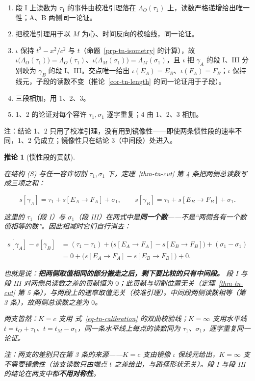 \documentclass[
  chinese,
  a4paper,
  UTF8,
  12pt,
  oneside,
  openany]{ctexbook}
\providecommand{\tightlist}{%
  \setlength{\itemsep}{0pt}\setlength{\parskip}{0pt}}
\theoremstyle{plain}
\theoremstyle{plain}
\theoremstyle{plain}
\theoremstyle{definition}
\theoremstyle{plain}
\newtheorem{corollary}{推论}[chapter]
\theoremstyle{plain}
\theoremstyle{remark}
\begin{document}
\begin{enumerate}
\def\labelenumi{\arabic{enumi}.}
\tightlist
\item
  段 I 上读数为 \(\tau_1\) 的事件由校准引理落在 \(\Lambda_O(\tau_1)\)
  上，读数严格递增给出唯一性；A、B 两侧同一论证。
\item
  把校准引理用于以 \(M\) 为心、时间反向的校验线，同一论证。
\item
  \(\iota\) 保持 \(t^{2}-x^{2}/c^{2}\) 与
  \(t\)（命题~\ref{prp-tn-isometry} 的计算），故
  \(\iota\bigl(\Lambda_O(\tau_1)\bigr)=\Lambda_O(\tau_1)\)、\(\iota\bigl(\Lambda_M(\sigma_1)\bigr)=\Lambda_M(\sigma_1)\)，且
  \(\iota\) 把 \(\gamma_A\) 的段 I、III 分别映为 \(\gamma_B\) 的段
  I、III。交点唯一给出 \(\iota(E_A)=E_B\)、\(\iota(F_A)=F_B\)；\(\iota\)
  保持线元，子段的读数不变（推论~\ref{cor-tn-length}
  的同一论证用于子段）。
\item
  三段相加，用 1、2、3。
\item
  1、2 的论证对每个容许 \(\tau_1,\sigma_1\) 逐字重复；4 由 1、2、3
  相加。
\end{enumerate}

注：结论 1、2
只用了校准引理，没有用到镜像性------即使两条惯性段的速率不同，1、2
仍成立；镜像性只在结论 3（中间段）处进入。

\begin{corollary}[惯性段的贡献]\protect\hypertarget{cor-tn-legs}{}\label{cor-tn-legs}

在结构 (S) 与任一容许切割 \(\tau_1,\sigma_1\) 下，定理~\ref{thm-tn-cut}
第 4 条把两侧总读数写成三项之和：

\[
s[\gamma_A]=\tau_1+s[E_A\to F_A]+\sigma_1,\qquad
s[\gamma_B]=\tau_1+s[E_B\to F_B]+\sigma_1 .
\]

这里的 \(\tau_1\)（段 I）与 \(\sigma_1\)（段
III）在两式中是\textbf{同一个数}------不是``两侧各有一个数值相等的数''。因此相减时它们自行消去：

\[
\begin{aligned}
s[\gamma_A]-s[\gamma_B]
&=(\tau_1-\tau_1)+\bigl(s[E_A\to F_A]-s[E_B\to F_B]\bigr)+(\sigma_1-\sigma_1)\\[2pt]
&=0+\bigl(s[E_A\to F_A]-s[E_B\to F_B]\bigr)+0 .
\end{aligned}
\]

也就是说：\textbf{把两侧取值相同的部分搬走之后，剩下要比较的只有中间段。}
段 I 与段 III 对两侧总读数之差的贡献恒为
\(0\)；此贡献与切割位置无关（定理~\ref{thm-tn-cut} 第 5
条），与两段上的速率取值无关（校准引理）。中间段两侧读数相等（第 3
条），故两侧总读数之差为 \(0\)。

两支皆然：\(K=c\) 支用 式~\ref{eq-tn-calibration}
的双曲校验线；\(K=\infty\) 支用水平线
\(t=t_O+\tau_1\)、\(t=t_M-\sigma_1\)，同一条水平线上每点的读数同为
\(\tau_1\)、\(\sigma_1\)，逐字重复同一论证。

注：两支的差别只在第 3 条的来源------\(K=c\) 支由镜像 \(\iota\)
保线元给出，\(K=\infty\) 支不需要镜像性（该支读数只由端点 \(t\)
之差给出，与路径形状无关）。段 I 与段 III
的结论在两支中都\textbf{不用对称性}。

\end{corollary}
\end{document}
